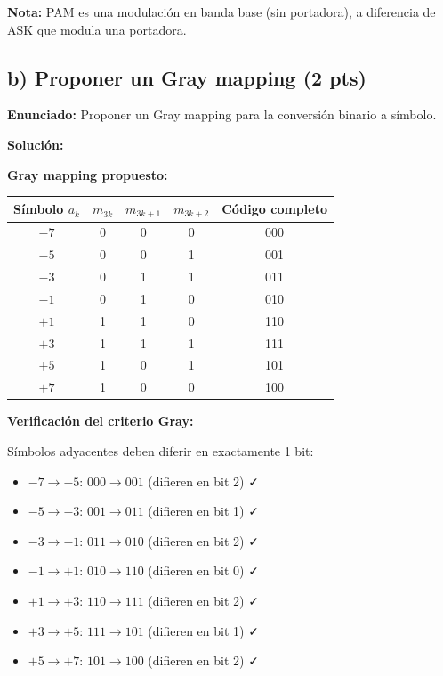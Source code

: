 \documentclass[11pt,a4paper]{article}
\begin{document}
\textbf{Nota:} PAM es una modulaci\'on en banda base (sin portadora), a diferencia de ASK que modula una portadora.



\subsection*{b) Proponer un Gray mapping (2 pts)}

\textbf{Enunciado:} Proponer un Gray mapping para la conversi\'on binario a s\'imbolo.

\vspace{0.3cm}
\textbf{Soluci\'on:}

\textbf{Gray mapping propuesto:}

\begin{center}
\begin{tabular}{|c|c|c|c|c|}
\hline
\textbf{S\'imbolo $a_k$} & \textbf{$m_{3k}$} & \textbf{$m_{3k+1}$} & \textbf{$m_{3k+2}$} & \textbf{C\'odigo completo} \\
\hline
$-7$ & 0 & 0 & 0 & 000 \\
$-5$ & 0 & 0 & 1 & 001 \\
$-3$ & 0 & 1 & 1 & 011 \\
$-1$ & 0 & 1 & 0 & 010 \\
$+1$ & 1 & 1 & 0 & 110 \\
$+3$ & 1 & 1 & 1 & 111 \\
$+5$ & 1 & 0 & 1 & 101 \\
$+7$ & 1 & 0 & 0 & 100 \\
\hline
\end{tabular}
\end{center}

\textbf{Verificaci\'on del criterio Gray:}

S\'imbolos adyacentes deben diferir en exactamente 1 bit:
\begin{itemize}
    \item $-7 \rightarrow -5$: $000 \rightarrow 001$ (difieren en bit 2) ✓
    \item $-5 \rightarrow -3$: $001 \rightarrow 011$ (difieren en bit 1) ✓
    \item $-3 \rightarrow -1$: $011 \rightarrow 010$ (difieren en bit 2) ✓
    \item $-1 \rightarrow +1$: $010 \rightarrow 110$ (difieren en bit 0) ✓
    \item $+1 \rightarrow +3$: $110 \rightarrow 111$ (difieren en bit 2) ✓
    \item $+3 \rightarrow +5$: $111 \rightarrow 101$ (difieren en bit 1) ✓
    \item $+5 \rightarrow +7$: $101 \rightarrow 100$ (difieren en bit 2) ✓
\end{itemize}
\end{document}
